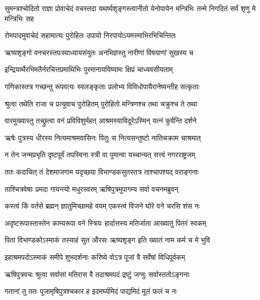 
\threelineshloka
{सुमन्त्रश्चोदितो राज्ञा प्रोवाचेदं वचस्तदा}
{यथर्ष्यशृङ्गस्त्वानीतो येनोपायेन मन्त्रिभिः}
{तन्मे निगदितं सर्वं शृणु मे मन्त्रिभिः सह} %

\twolineshloka
{रोमपादमुवाचेदं सहामात्यः पुरोहितः}
{उपायो निरपायोऽयमस्माभिरभिचिन्तितः} %

\twolineshloka
{ऋष्यशृङ्गो वनचरस्तपःस्वाध्यायसंयुतः}
{अनभिज्ञस्तु नारीणां विषयाणां सुखस्य च} %

\twolineshloka
{इन्द्रियार्थैरभिमतैर्नरचित्तप्रमाथिभिः}
{पुरमानाययिष्यामः क्षिप्रं चाध्यवसीयताम्} %

\twolineshloka
{गणिकास्तत्र गच्छन्तु रूपवत्यः स्वलङ्कृताः}
{प्रलोभ्य विविधोपायैरानेष्यन्तीह सत्कृताः} %

\twolineshloka
{श्रुत्वा तथेति राजा च प्रत्युवाच पुरोहितम्}
{पुरोहितो मन्त्रिणश्च तथा चक्रुश्च ते तथा} %

\twolineshloka
{वारमुख्यास्तु तच्छ्रुत्वा वनं प्रविविशुर्महत्}
{आश्रमस्याविदूरेऽस्मिन् यत्नं कुर्वन्ति दर्शने} %

\twolineshloka
{ऋषेः पुत्रस्य धीरस्य नित्यमाश्रमवासिनः}
{पितुः स नित्यसन्तुष्टो नातिचक्राम चाश्रमात्} %

\twolineshloka
{न तेन जन्मप्रभृति दृष्टपूर्वं तपस्विना}
{स्त्री वा पुमान्वा यच्चान्यत् सत्त्वं नगरराष्ट्रजम्} %

\twolineshloka
{ततः कदाचित् तं देशमाजगाम यदृच्छया}
{विभाण्डकसुतस्तत्र ताश्चापश्यद् वराङ्गनाः} %

\twolineshloka
{ताश्चित्रवेषाः प्रमदा गायन्त्यो मधुरस्वरम्}
{ऋषिपुत्रमुपागम्य सर्वा वचनमब्रुवन्} %

\twolineshloka
{कस्त्वं किं वर्तसे ब्रह्मन् ज्ञातुमिच्छामहे वयम्}
{एकस्त्वं विजने घोरे वने चरसि शंस नः} %

\twolineshloka
{अदृष्टरूपास्तास्तेन काम्यरूपा वने स्त्रियः}
{हार्दात्तस्य मतिर्जाता आख्यातुं पितरं स्वकम्} %

\twolineshloka
{पिता विभाण्डकोऽस्माकं तस्याहं सुत औरसः}
{ऋष्यशृङ्ग इति ख्यातं नाम कर्म च मे भुवि} %

\twolineshloka
{इहाश्रमपदोऽस्माकं समीपे शुभदर्शनाः}
{करिष्ये वोऽत्र पूजां वै सर्वेषां विधिपूर्वकम्} %

\twolineshloka
{ऋषिपुत्रवचः श्रुत्वा सर्वासां मतिरास वै}
{तदाश्रमपदं द्रष्टुं जग्मुः सर्वास्ततोऽङ्गनाः} %

\twolineshloka
{गतानां तु ततः पूजामृषिपुत्रश्चकार ह}
{इदमर्घ्यमिदं पाद्यमिदं मूलं फलं च नः} %

